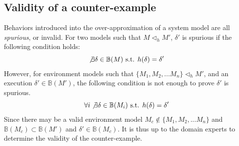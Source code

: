\subsection{Validity of a counter-example }
Behaviors introduced into the over-approximation of a system model are all \emph{spurious}, or invalid. For two models such that $M\triangleleft_h M'$, $\delta'$ is spurious if the following condition holds: 
$$\not\exists \delta\in\mathbb{B}(M) \text{ s.t. }h(\delta)=\delta'$$
However, for environment models such that $\{M_1,M_2,...M_n\}\triangleleft_h M'$, and an execution $\delta'\in\mathbb{B}(M')$, the following condition is not enough to prove $\delta'$ is spurious.
$$\forall i\not\exists \delta\in\mathbb{B}(M_i)\text{ s.t. }h(\delta)=\delta'$$
Since there may be a valid environment model $M_c\not\in\{M_1,M_2,...M_n\}$ and $\mathbb{B}(M_c)\subset\mathbb{B}(M')$ and $\delta'\in\mathbb{B}(M_c)$. It is thus up to the domain experts to determine the validity of the counter-example.
%
